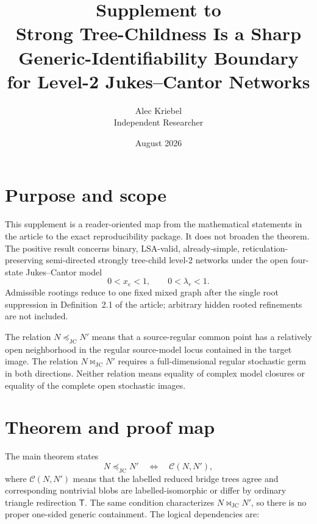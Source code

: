 \documentclass[11pt]{article}
\title{Supplement to\\
Strong Tree-Childness Is a Sharp Generic-Identifiability Boundary\\
for Level-2 Jukes--Cantor Networks}
\author{Alec Kriebel\\\small Independent Researcher}
\date{August 2026}
\newcommand{\JC}{\mathrm{JC}}
\newcommand{\Tmove}{\mathsf T}
\newcommand{\preceqjc}{\preceq_{\!\JC}}
\newcommand{\bowtiejc}{\mathbin{\bowtie}_{\!\JC}}
\begin{document}
\maketitle

\section{Purpose and scope}

This supplement is a reader-oriented map from the mathematical statements in
the article to the exact reproducibility package.  It does not broaden the
theorem.  The positive result concerns binary, LSA-valid, already-simple,
reticulation-preserving semi-directed strongly tree-child level-2 networks
under the open four-state Jukes--Cantor model
\[
0<x_e<1,\qquad 0<\lambda_r<1.
\]
Admissible rootings reduce to one fixed mixed graph after the single root
suppression in Definition~2.1 of the article; arbitrary hidden rooted
refinements are not included.

The relation $N\preceqjc N'$ means that a source-regular common point has a
relatively open neighborhood in the regular source-model locus contained in
the target image.  The relation $N\bowtiejc N'$ requires a full-dimensional
regular stochastic germ in both directions.
Neither relation means equality of complex model closures or equality of the
complete open stochastic images.

\section{Theorem and proof map}

The main theorem states
\[
N\preceqjc N'
\quad\Longleftrightarrow\quad \mathcal C(N,N'),
\]
where $\mathcal C(N,N')$ means that the labelled reduced bridge trees agree
and corresponding nontrivial blobs are labelled-isomorphic or differ by
ordinary triangle redirection $\Tmove$.
The same condition characterizes $N\bowtiejc N'$, so there is no proper
one-sided generic containment.  The logical dependencies are:
\end{document}
